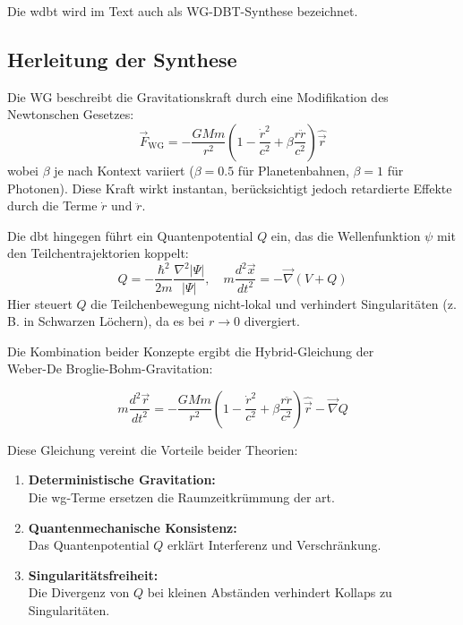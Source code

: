 Die \gls{wdbt} wird im Text auch als WG-DBT-Synthese bezeichnet.

\subsection{Herleitung der Synthese}
Die WG beschreibt die Gravitationskraft durch eine Modifikation des Newtonschen Gesetzes:
\begin{equation}
    \label{eq:wg-dbt}
    \vec{F}_{\text{WG}} = -\frac{GMm}{r^2}\left(1 - \frac{\dot{r}^2}{c^2} + \beta \frac{r\ddot{r}}{c^2}\right)\hat{\vec{r}}
\end{equation}
wobei $\beta$ je nach Kontext variiert ($\beta=0.5$ für Planetenbahnen, $\beta=1$ für Photonen). Diese Kraft wirkt instantan, berücksichtigt jedoch retardierte Effekte durch die
Terme $\dot{r}$ und $\ddot{r}$.

Die \gls{dbt} hingegen führt ein Quantenpotential $Q$ ein, das die Wellenfunktion $\psi$ mit den Teilchentrajektorien koppelt:
\begin{equation}
    \label{eq:wg-dbt-q}
    Q = -\frac{\hbar^2}{2m}\frac{\nabla^2 |\Psi|}{|\Psi|}, \quad m\frac{d^2\vec{x}}{dt^2} = -\vec{\nabla}(V + Q)
\end{equation}
Hier steuert $Q$ die Teilchenbewegung nicht-lokal und verhindert Singularitäten (z. B. in Schwarzen Löchern), da es bei $r \to 0$ divergiert.

Die Kombination beider Konzepte ergibt die Hybrid-Gleichung der\\Weber-De Broglie-Bohm-Gravitation:

\begin{equation}
    m\frac{d^2\vec{r}}{dt^2} = -\frac{GMm}{r^2}\left(1 - \frac{\dot{r}^2}{c^2} + \beta \frac{r\ddot{r}}{c^2}\right)\hat{{\vec{r}}} - \vec{\nabla} Q
\end{equation}

Diese Gleichung vereint die Vorteile beider Theorien:
\begin{enumerate}
    \item \textbf{Deterministische Gravitation:}\\Die \gls{wg}-Terme ersetzen die Raumzeitkrümmung der \gls{art}.
    \item \textbf{Quantenmechanische Konsistenz:}\\Das Quantenpotential $Q$ erklärt Interferenz und Verschränkung.
    \item \textbf{Singularitätsfreiheit:}\\Die Divergenz von $Q$ bei kleinen Abständen verhindert Kollaps zu Singularitäten.
\end{enumerate}

